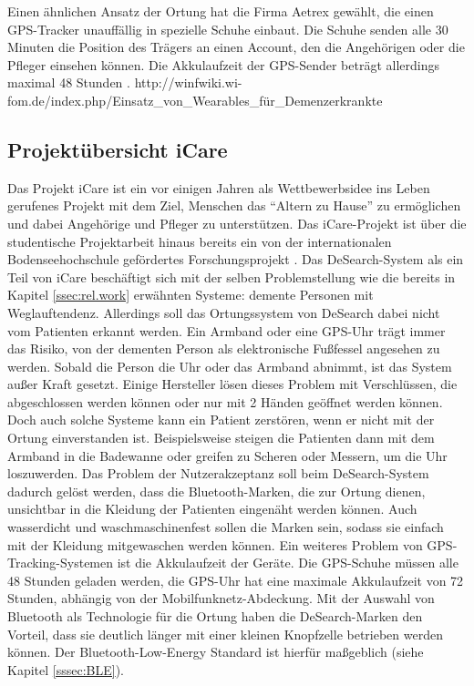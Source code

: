 Einen ähnlichen Ansatz der Ortung hat die Firma Aetrex gewählt, die einen GPS-Tracker unauffällig in spezielle Schuhe einbaut. Die Schuhe senden alle 30 Minuten die Position des Trägers an einen Account, den die Angehörigen oder die Pfleger einsehen können. Die Akkulaufzeit der GPS-Sender beträgt allerdings maximal 48 Stunden \citep[Vgl.][]{aetrex}.
http://winfwiki.wi-fom.de/index.php/Einsatz\_von\_Wearables\_für\_Demenzerkrankte\\




\subsection{Projektübersicht iCare}
Das Projekt iCare ist ein vor einigen Jahren als Wettbewerbsidee ins Leben gerufenes Projekt mit dem Ziel, Menschen das \enquote{Altern zu Hause} zu ermöglichen und dabei Angehörige und Pfleger zu unterstützen.  Das iCare-Projekt ist über die studentische Projektarbeit hinaus bereits ein von der internationalen Bodenseehochschule gefördertes Forschungsprojekt \citep[Vgl.][]{icare-dhbw}.
Das DeSearch-System als ein Teil von iCare beschäftigt sich mit der selben Problemstellung wie die bereits in Kapitel \ref{ssec:rel.work} erwähnten Systeme: demente Personen mit Weglauftendenz. Allerdings soll das Ortungssystem von DeSearch dabei nicht vom Patienten erkannt werden. Ein Armband oder eine GPS-Uhr trägt immer das Risiko, von der dementen Person als elektronische Fußfessel angesehen zu werden. Sobald die Person die Uhr oder das Armband abnimmt, ist das System außer Kraft gesetzt. Einige Hersteller lösen dieses Problem mit Verschlüssen, die abgeschlossen werden können oder nur mit 2 Händen geöffnet werden können. Doch auch solche Systeme kann ein Patient zerstören, wenn er nicht mit der Ortung einverstanden ist. Beispielsweise steigen die Patienten dann mit dem Armband in die Badewanne oder greifen zu Scheren oder Messern, um die Uhr loszuwerden. Das Problem der Nutzerakzeptanz soll beim DeSearch-System dadurch gelöst werden, dass die Bluetooth-Marken, die zur Ortung dienen, unsichtbar in die Kleidung der Patienten eingenäht werden können. Auch wasserdicht und waschmaschinenfest sollen die Marken sein, sodass sie einfach mit der Kleidung mitgewaschen werden können. Ein weiteres Problem von GPS-Tracking-Systemen ist die Akkulaufzeit der Geräte. Die GPS-Schuhe müssen alle 48 Stunden geladen werden, die GPS-Uhr hat eine maximale Akkulaufzeit von 72 Stunden, abhängig von der Mobilfunknetz-Abdeckung. Mit der Auswahl von Bluetooth als Technologie für die Ortung haben die DeSearch-Marken den Vorteil, dass sie deutlich länger mit einer kleinen Knopfzelle betrieben werden können. Der Bluetooth-Low-Energy Standard ist hierfür maßgeblich (siehe Kapitel \ref{sssec:BLE}).


